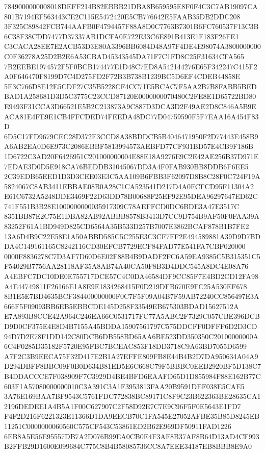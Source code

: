 \documentclass[UTF8,fontset=fandol,zihao=-4,a4paper]{ctexart}
\begin{document}
{{7849000000008018DEFF214B82EBBB21DBA8B659595E8F0F4C3C7AB19097CA801B7194EF563443CE2C115E5472420E5CB776642E5FAAB35DB2DDC208
3F325C89842FCB744AAFB0F4794457F88A8D0C7763B7301B6FC760537F13C3B6C38F38CDD7477D37337AB1DCFA0E722E33C6E891B413E1F183F26FE1
C3CACA28EE7E2ACB53D3E80A3396BB6084D48A97F4DE4E98074A3800000000C0F36278A25D2B2E6A53CBAD45343545DA71F7C1FD8C25F31634CFA565
7B2EEBE1974572F5F0BCB174477E1D48C7ED8A542144276E65F342247C415F2A0F646470F8199D7C4D275FD2F72B3B738B1239BC5D6EF4CDEB44858E
5E3C766D8E12E5CDF27C35B5228CF4CC71E5BCAC7F5AA2B7B8FABB5BEDBAD1A258681D3D5C3775C23CCD87120E0000000070480C2FE8E1D65722BD80
E9493F31CCA3D66521E5B2C213873A9C887D3DCA3D2F49AE2D8C846A5B9EACA81E4FE9E1CB4FFCDED74FEEDA48DC77D04759590F5F7EAA16A454F83D
6D5C17FD9679CEC28D372E3CCD8A38BDDCB5B4046471950F2D77443E458B9A6AB2EA0D6E973C2086EBBF5813994573AEBFD77CF931BD57E4CB9F186B
1D6722C3AD20F6426951C201000000004E88E18A9276E9C2E42AE256B37D971E7EDAE3D0D5E918CA76BEDDB31045067DD3A4F0FAB930BB8DDB6F6EE5
2C39EDB65EED1D3D3CEE03E3C5AA109B6FBB3F62097D8B8C28F0C724F19A5824067C8AB3411EBBAE08B0A28C1CA523541D217D4A0FCFCD95F11304A2
E61C6732A5248DDE3469F22D63DD78B00688F25EF92E95DEA96297647ED62C741F551B3B28E1000000000035917309C78AEFFCD0DC6BDE3A47E3517C
8351BB87E2C75E1DBA82AB92ABBB8578B3413D7CC9D754B9AF50F0FAA39A83252F61A1BD949D825CD6564A35B533D257B7007E3862BCAF878B1B7FE2
13A6D4B9C22E58E1A50ABBD585C5C255E3C3CF7FF2E494589881A39D9D7BDDA4C149161165C8242116CD30EFCB7729ECF84FAD77E541FA7CBF020000
0000F8836278C7D3AF7D60D6E02F88B4B9DADF2FC6A59EA9385C5B315351C5F54029B7756AA28118AF35A8AB74A40CA50F8B3D4DDC545A8DC4E08A76
A4EBFC7DC10DE0E755717DCE57C4C0DA46584DF9CC85F7E4BD2CD12FA98A4E44749811F26166E1A8E9E1834268415F0D219DFB670E9FC25A530EF678
8B1E5E7BD4635BCF384400000000F0C7F5F09A04B7F59AB72240CC856497E3A666F5F09093BB6EB5EBBCDE145D258F33549EB675303BDAD15627512A
E7A893B8CCE42A964C246EA66C0531717FC77A5ABC2F7329C057CBE396DCBD9D0CF375E4E8D4B7155A45BDDA15907561797C575DDCFF0DFFF6D2D3CD
94D7D2E78F1DD142C80DCB6DB558BD65AA6BE523DD350350C20100000000A6C4F0285D35182F5720E95FBC7BCEAC853F18DD3718C9A63BD7055D6599
A7F2C3B9EECA75F32D417E2B1A27EFFE809FB8E44B4B2D7DA950634A04A9D294DBFF8BBC09F0B0D634B81ED5E6C668C79F5BBBC0EEB2920BF5D138C7
B4DDACCCE7F038909F7C3929D4BE4BFD6EAAFD65D1D855984F88E162B77C603F1A57080000000010C3A391C3A1F3953813FAA20B9591DEF038E5CAE5
3A76E169BAA7BF9543C5761FDC772838BC89171C8F9C23B622363BE28635CA12196DEDEE1A4B5A1F00C627907C2F58D92E7C7E9C96F5F0E5643E1FD7
F4F2D216F6221323E11366D1DA9EECB70C1FA545E27052AFBE35B85D8245EB11251C0000000060560C575CF543C53861ED2B62E969DF50911FAD1226
6EB8A5E56E95557DB7A2D076B99EA0CB0E4F3AF8B37AF8B64D13AD4CF993B2FFB29D1600E099684C775C8B4B58085736CC8A7EEE34187EB8BBB8E9A0
}}
\end{document}
